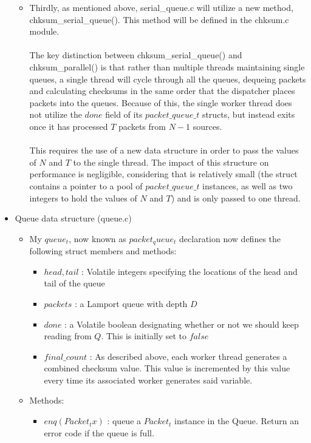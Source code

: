 \documentclass[]{article}
\begin{document}
\begin{itemize}
\begin{itemize}
		\item Thirdly, as mentioned above, serial\_queue.c will utilize a new method, chksum\_serial\_queue(). This method will be defined in the chksum.c module.
		\\\\
		The key distinction between chksum\_serial\_queue() and chksum\_parallel() is that rather than multiple threads maintaining single queues, a single thread will cycle through all the queues, dequeing packets and calculating checksums in the same order that the dispatcher places packets into the queues. Because of this, the single worker thread does not utilize the $done$ field of its $packet\_queue\_t$ structs, but instead exits once it has processed $T$ packets from $N - 1$ sources.
		\\\\
		This requires the use of a new data structure in order to pass the values of $N$ and $T$ to the single thread. The impact of this structure on performance is negligible, considering that is relatively small (the struct contains a pointer to a pool of $packet\_queue\_t$ instances, as well as two integers to hold the values of $N$ and $T$) and is only passed to one thread.
	\end{itemize}
	\item Queue data structure (queue.c)
	\begin{itemize}
		\item My $queue_t$, now known as $packet_queue_t$ declaration now defines the following struct members and methods:
		\begin{itemize}
			\item $head, tail$ : Volatile integers specifying the locations of the head and tail of the queue
			\item $packets$ : a Lamport queue with depth $D$
			\item $done$ : a Volatile boolean designating whether or not we should keep
			reading from $Q$. This is initially set to $false$
			\item $final\_count$ : As described above, each worker thread generates a combined checksum value. This value is incremented by this value every time its associated worker generates said variable.
		\end{itemize}
		\item Methods:
		\begin{itemize}
			\item $enq(Packet_t x)$ : queue a $Packet_t$ instance in the Queue. Return an error code if the queue is full.

\end{itemize}
\end{itemize}
\end{itemize}
\end{document}
